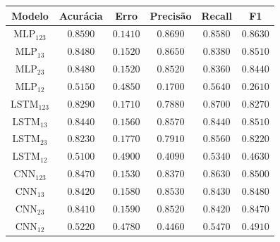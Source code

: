 \documentclass[a4paper,fleqn]{cas-sc}
\begin{document}
\begin{minipage}{0.45\textwidth}
	\vspace{0.5cm}
	\begingroup
	\begin{tiny}	
		\setlength{\tabcolsep}{3pt}
		\renewcommand{\arraystretch}{1.15}
		
		
		\begin{tabular*}{\textwidth}{@{} CCCCCC@{} }
			\toprule
			Modelo&Acurácia&Erro&Precisão&Recall&F1 \\
			\midrule
				MLP$_{123}$ & $0.8590$ & $0.1410$ & $0.8690$ & $0.8580$ & $0.8630$ \\
				MLP$_{13}$ & $0.8480$ & $0.1520$ & $0.8650$ & $0.8380$ & $0.8510$ \\
				MLP$_{23}$ & $0.8480$ & $0.1520$ & $0.8520$ & $0.8360$ & $0.8440$ \\
				MLP$_{12}$ & $0.5150$ & $0.4850$ & $0.1700$ & $0.5640$ & $0.2610$ \\
				LSTM$_{123}$ & $0.8290$ & $0.1710$ & $0.7880$ & $0.8700$ & $0.8270$ \\
				LSTM$_{13}$ & $0.8440$ & $0.1560$ & $0.8570$ & $0.8440$ & $0.8510$ \\
				LSTM$_{23}$ & $0.8230$ & $0.1770$ & $0.7910$ & $0.8560$ & $0.8220$ \\
				LSTM$_{12}$ & $0.5100$ & $0.4900$ & $0.4090$ & $0.5340$ & $0.4630$ \\
				CNN$_{123}$ & $0.8470$ & $0.1530$ & $0.8370$ & $0.8630$ & $0.8500$ \\
				CNN$_{13}$ & $0.8420$ & $0.1580$ & $0.8530$ & $0.8430$ & $0.8480$ \\
				CNN$_{23}$ & $0.8410$ & $0.1590$ & $0.8520$ & $0.8420$ & $0.8470$ \\
				CNN$_{12}$ & $0.5220$ & $0.4780$ & $0.4460$ & $0.5470$ & $0.4910$ \\
			\bottomrule
		\end{tabular*}
		\vspace{-0.3cm}
		\label{tab:metricas_1000Mbps_teste}
	\end{tiny}
	\endgroup	
\end{minipage}
\\
\\
\\
\begingroup
\captionsetup[figure]{font=tiny}
\hfill
\end{document}
